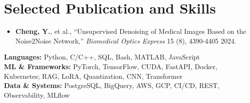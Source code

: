 \documentclass[letterpaper,10pt]{article}
\begin{document}
\begin{itemize}[leftmargin=0in, label={}]
\end{itemize}
\vspace*{-10pt}
\vspace*{-2pt}
\fontsize{10pt}{12pt}\selectfont

\section{Selected Publication and Skills}
\begin{itemize}[leftmargin=0.2in]
  \item \small \textbf{Cheng, Y.}, et al., ``Unsupervised Denoising of Medical Images Based on the Noise2Noise Network,'' \textit{Biomedical Optics Express} 15 (8), 4390-4405 2024.
\end{itemize}
\vspace*{-5pt}
\noindent \small
\textbf{Languages:} Python, C/C++, SQL, Bash, MATLAB, JavaScript \\
\textbf{ML \& Frameworks:} PyTorch, TensorFlow, CUDA, FastAPI, Docker, Kubernetes; RAG, LoRA, Quantization, CNN, Transformer \\
\textbf{Data \& Systems:} PostgreSQL, BigQuery, AWS, GCP, CI/CD, REST, Observability, MLflow
\end{document}

